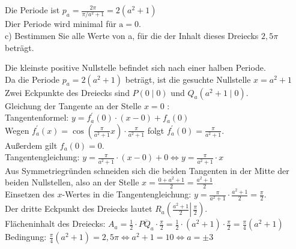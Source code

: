 \documentclass[10pt]{article}
\begin{document}
Die Periode ist $p_{a}=\frac{2 \pi}{\pi / a^{2}+1}=2\left(a^{2}+1\right)$\\
Dier Periode wird minimal für $\mathrm{a}=0$.\\
c) Bestimmen Sie alle Werte von a, für die der Inhalt dieses Dreiecks $2,5 \pi$ beträgt.

Die kleinste positive Nullstelle befindet sich nach einer halben Periode.\\
Da die Periode $p_{a}=2\left(a^{2}+1\right)$ beträgt, ist die gesuchte Nullstelle $x=a^{2}+1$\\
Zwei Eckpunkte des Dreiecks sind $P(0 \mid 0)$ und $Q_{a}\left(a^{2}+1 \mid 0\right)$.\\
Gleichung der Tangente an der Stelle $x=0$ :\\
Tangentenformel: $y=f_{a}^{\prime}(0) \cdot(x-0)+f_{a}(0)$\\
Wegen $f_{a}^{\prime}(x)=\cos \left(\frac{\pi}{a^{2}+1} x\right) \cdot \frac{\pi}{a^{2}+1}$ folgt $f_{a}^{\prime}(0)=\frac{\pi}{a^{2}+1}$.\\
Außerdem gilt $f_{a}(0)=0$.\\
Tangentengleichung: $y=\frac{\pi}{a^{2}+1} \cdot(x-0)+0 \Leftrightarrow y=\frac{\pi}{a^{2}+1} \cdot x$\\
Aus Symmetriegründen schneiden sich die beiden Tangenten in der Mitte der beiden Nullstellen, also an der Stelle $x=\frac{0+a^{2}+1}{2}=\frac{a^{2}+1}{2}$\\
Einsetzen des $x$-Wertes in die Tangentengleichung: $y=\frac{\pi}{a^{2}+1} \cdot \frac{a^{2}+1}{2}=\frac{\pi}{2}$.\\
Der dritte Eckpunkt des Dreiecks lautet $R_{a}\left(\left.\frac{a^{2}+1}{2} \right\rvert\, \frac{\pi}{2}\right)$.\\
Flächeninhalt des Dreiecks: $A_{a}=\frac{1}{2} \cdot \overline{P Q_{a}} \cdot \frac{\pi}{2}=\frac{1}{2} \cdot\left(a^{2}+1\right) \cdot \frac{\pi}{2}=\frac{\pi}{4}\left(a^{2}+1\right)$\\
Bedingung: $\frac{\pi}{4}\left(a^{2}+1\right)=2,5 \pi \Leftrightarrow a^{2}+1=10 \Leftrightarrow a= \pm 3$
\end{document}
